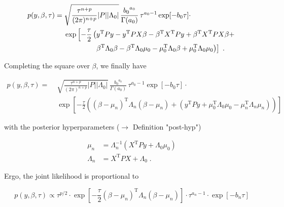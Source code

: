 \documentclass[a4paper,12pt]{book}
\begin{document}
\begin{equation} \label{eq:blr-post-GLM-NG-JL-s3}
\begin{split}
p(y,\beta,\tau) = \; & \sqrt{\frac{\tau^{n+p}}{(2 \pi)^{n+p}} |P| |\Lambda_0|} \, \frac{ {b_0}^{a_0}}{\Gamma(a_0)} \, \tau^{a_0-1} \exp[-b_0 \tau] \cdot \\
& \exp\left[ -\frac{\tau}{2} \left( y^\mathrm{T} P y - y^\mathrm{T} P X \beta - \beta^\mathrm{T} X^\mathrm{T} P y + \beta^\mathrm{T} X^\mathrm{T} P X \beta + \right. \right. \\
& \hphantom{\exp \left[ -\frac{\tau}{2} \right.} \; \left. \left. \beta^\mathrm{T} \Lambda_0 \beta - \beta^\mathrm{T} \Lambda_0 \mu_0 - \mu_0^\mathrm{T} \Lambda_0 \beta + \mu_0^\mathrm{T} \Lambda_0 \mu_0 \right) \right] \; .
\end{split}
\end{equation}

Completing the square over $\beta$, we finally have

\begin{equation} \label{eq:blr-post-GLM-NG-JL-s4}
\begin{split}
p(y,\beta,\tau) = \; & \sqrt{\frac{\tau^{n+p}}{(2 \pi)^{n+p}} |P| |\Lambda_0|} \, \frac{ {b_0}^{a_0}}{\Gamma(a_0)} \, \tau^{a_0-1} \exp[-b_0 \tau] \cdot \\
& \exp\left[ -\frac{\tau}{2} \left( (\beta-\mu_n)^\mathrm{T} \Lambda_n (\beta-\mu_n) + (y^\mathrm{T} P y + \mu_0^\mathrm{T} \Lambda_0 \mu_0 - \mu_n^\mathrm{T} \Lambda_n \mu_n) \right) \right]
\end{split}
\end{equation}

with the posterior hyperparameters ($\rightarrow$ Definition "post-hyp")

\begin{equation} \label{eq:blr-post-GLM-NG-post-beta-par}
\begin{split}
\mu_n &= \Lambda_n^{-1} (X^\mathrm{T} P y + \Lambda_0 \mu_0) \\
\Lambda_n &= X^\mathrm{T} P X + \Lambda_0 \; .
\end{split}
\end{equation}

Ergo, the joint likelihood is proportional to

\begin{equation} \label{eq:blr-post-GLM-NG-JL-s5}
p(y,\beta,\tau) \propto \tau^{p/2} \cdot \exp\left[ -\frac{\tau}{2} (\beta-\mu_n)^\mathrm{T} \Lambda_n (\beta-\mu_n) \right] \cdot \tau^{a_n-1} \cdot \exp\left[ -b_n \tau \right]
\end{equation}
\end{document}
